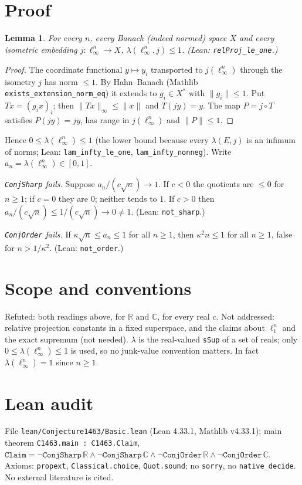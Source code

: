 \documentclass[11pt]{article}
\newtheorem{lemma}{Lemma}
\begin{document}
\section*{Proof}
\begin{lemma}\label{l:one} For every $n$, every Banach (indeed normed) space $X$ and every isometric embedding $j:\ell_\infty^n\to X$, $\lambda(\ell_\infty^n,j)\le1$. (Lean: \texttt{relProj\_le\_one}.)\end{lemma}
\begin{proof} The coordinate functional $y\mapsto y_i$ transported to $j(\ell_\infty^n)$ through the isometry $j$ has norm $\le1$. By Hahn--Banach (Mathlib \texttt{exists\_extension\_norm\_eq}) it extends to $g_i\in X^*$ with $\|g_i\|\le1$. Put $T x=(g_i x)_{i}$; then $\|Tx\|_\infty\le\|x\|$ and $T(jy)=y$. The map $P=j\circ T$ satisfies $P(jy)=jy$, has range in $j(\ell_\infty^n)$ and $\|P\|\le1$.
\end{proof}
Hence $0\le\lambda(\ell_\infty^n)\le1$ (the lower bound because every $\lambda(E,j)$ is an infimum of norms; Lean: \texttt{lam\_infty\_le\_one}, \texttt{lam\_infty\_nonneg}). Write $a_n=\lambda(\ell_\infty^n)\in[0,1]$.

\emph{\texttt{ConjSharp} fails.} Suppose $a_n/(c\sqrt n)\to1$. If $c<0$ the quotients are $\le0$ for $n\ge1$; if $c=0$ they are $0$; neither tends to $1$. If $c>0$ then $a_n/(c\sqrt n)\le1/(c\sqrt n)\to0\ne1$. (Lean: \texttt{not\_sharp}.)

\emph{\texttt{ConjOrder} fails.} If $\kappa\sqrt n\le a_n\le1$ for all $n\ge1$, then $\kappa^2n\le1$ for all $n\ge1$, false for $n>1/\kappa^2$. (Lean: \texttt{not\_order}.)

\section*{Scope and conventions}
Refuted: both readings above, for $\mathbb R$ and $\mathbb C$, for every real $c$. Not addressed: relative projection constants in a fixed superspace, and the claims about $\ell_1^n$ and the exact supremum (not needed). $\lambda$ is the real-valued \texttt{sSup} of a set of reals; only $0\le\lambda(\ell_\infty^n)\le1$ is used, so no junk-value convention matters. In fact $\lambda(\ell_\infty^n)=1$ since $n\ge1$.

\section*{Lean audit}
File \texttt{lean/Conjecture1463/Basic.lean} (Lean 4.33.1, Mathlib v4.33.1); main theorem \texttt{C1463.main : C1463.Claim}, $\texttt{Claim}=\neg\texttt{ConjSharp}\,\mathbb R\wedge\neg\texttt{ConjSharp}\,\mathbb C\wedge\neg\texttt{ConjOrder}\,\mathbb R\wedge\neg\texttt{ConjOrder}\,\mathbb C$. Axioms: \texttt{propext}, \texttt{Classical.choice}, \texttt{Quot.sound}; no \texttt{sorry}, no \texttt{native\_decide}. No external literature is cited.
\end{document}
